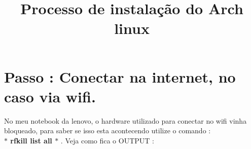 \documentclass[11pt, a4paper] {article}
\begin{document}
	\title{Processo de instalação do Arch linux}
	\section{Passo : Conectar na internet, no caso via wifi.}
	 	No meu notebook da lenovo, o hardware utilizado para conectar no wifi vinha bloqueado, para saber se isso esta acontecendo utilize o comando :\\
	 	 \textbf{ $\ast$ rfkill list all $\ast$} . Veja como fica o OUTPUT :
		
\end{document}
